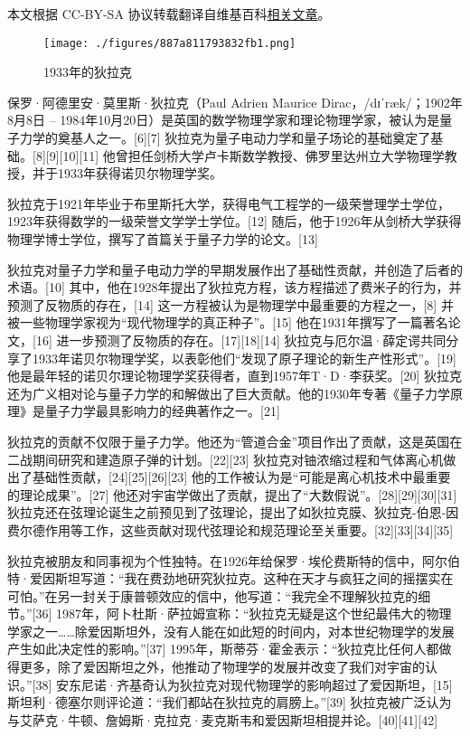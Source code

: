 
本文根据 CC-BY-SA 协议转载翻译自维基百科\href{https://en.wikipedia.org/wiki/Paul_Dirac}{相关文章}。

\begin{figure}[ht]
\centering
\texttt{[image: ./figures/887a811793832fb1.png]}
\caption{1933年的狄拉克} \label{fig_DLK1_1}
\end{figure}
保罗·阿德里安·莫里斯·狄拉克（Paul Adrien Maurice Dirac，/dɪˈræk/；1902年8月8日 – 1984年10月20日）是英国的数学物理学家和理论物理学家，被认为是量子力学的奠基人之一。[6][7] 狄拉克为量子电动力学和量子场论的基础奠定了基础。[8][9][10][11] 他曾担任剑桥大学卢卡斯数学教授、佛罗里达州立大学物理学教授，并于1933年获得诺贝尔物理学奖。

狄拉克于1921年毕业于布里斯托大学，获得电气工程学的一级荣誉理学士学位，1923年获得数学的一级荣誉文学学士学位。[12] 随后，他于1926年从剑桥大学获得物理学博士学位，撰写了首篇关于量子力学的论文。[13]

狄拉克对量子力学和量子电动力学的早期发展作出了基础性贡献，并创造了后者的术语。[10] 其中，他在1928年提出了狄拉克方程，该方程描述了费米子的行为，并预测了反物质的存在，[14] 这一方程被认为是物理学中最重要的方程之一，[8] 并被一些物理学家视为“现代物理学的真正种子”。[15] 他在1931年撰写了一篇著名论文，[16] 进一步预测了反物质的存在。[17][18][14] 狄拉克与厄尔温·薛定谔共同分享了1933年诺贝尔物理学奖，以表彰他们“发现了原子理论的新生产性形式”。[19] 他是最年轻的诺贝尔理论物理学奖获得者，直到1957年T·D·李获奖。[20] 狄拉克还为广义相对论与量子力学的和解做出了巨大贡献。他的1930年专著《量子力学原理》是量子力学最具影响力的经典著作之一。[21]

狄拉克的贡献不仅限于量子力学。他还为“管道合金”项目作出了贡献，这是英国在二战期间研究和建造原子弹的计划。[22][23] 狄拉克对铀浓缩过程和气体离心机做出了基础性贡献，[24][25][26][23] 他的工作被认为是“可能是离心机技术中最重要的理论成果”。[27] 他还对宇宙学做出了贡献，提出了“大数假说”。[28][29][30][31] 狄拉克还在弦理论诞生之前预见到了弦理论，提出了如狄拉克膜、狄拉克-伯恩-因费尔德作用等工作，这些贡献对现代弦理论和规范理论至关重要。[32][33][34][35]

狄拉克被朋友和同事视为个性独特。在1926年给保罗·埃伦费斯特的信中，阿尔伯特·爱因斯坦写道：“我在费劲地研究狄拉克。这种在天才与疯狂之间的摇摆实在可怕。”在另一封关于康普顿效应的信中，他写道：“我完全不理解狄拉克的细节。”[36] 1987年，阿卜杜斯·萨拉姆宣称：“狄拉克无疑是这个世纪最伟大的物理学家之一……除爱因斯坦外，没有人能在如此短的时间内，对本世纪物理学的发展产生如此决定性的影响。”[37] 1995年，斯蒂芬·霍金表示：“狄拉克比任何人都做得更多，除了爱因斯坦之外，他推动了物理学的发展并改变了我们对宇宙的认识。”[38] 安东尼诺·齐基奇认为狄拉克对现代物理学的影响超过了爱因斯坦，[15] 斯坦利·德塞尔则评论道：“我们都站在狄拉克的肩膀上。”[39] 狄拉克被广泛认为与艾萨克·牛顿、詹姆斯·克拉克·麦克斯韦和爱因斯坦相提并论。[40][41][42]
